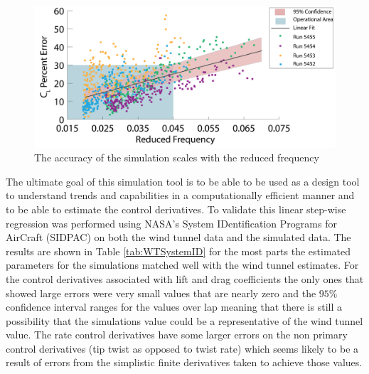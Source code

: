 \documentclass[11pt]{ucthesis}
\begin{document}
\begin{figure}[thpb]
\centering
\includegraphics[width=.75\linewidth]{Figures/ReducedFreqvCLPError-01.png}
\caption{The accuracy of the simulation scales with the reduced frequency}
\label{fig:RFreqvCLEr}
\end{figure}

The ultimate goal of this simulation tool is to be able to be used as a design tool to understand trends and capabilities in a computationally efficient manner and to be able to estimate the control derivatives. To validate this linear step-wise regression was performed using NASA's System IDentification Programs for AirCraft (SIDPAC) \cite{klein2006aircraft} on both the wind tunnel data and the simulated data. The results are shown in Table \ref{tab:WTSystemID} for the most parts the estimated parameters for the simulations matched well with the wind tunnel estimates. For the control derivatives associated with lift and drag coefficients the only ones that showed large errors were very small values that are nearly zero and the $95\%$ confidence interval ranges for the values over lap meaning that there is still a possibility that the simulations value could be a representative of the wind tunnel value. The rate control derivatives have some larger errors on the non primary control derivatives (tip twist as opposed to twist rate) which seems likely to be a result of errors from the simplistic finite derivatives  taken to achieve those values.%
\end{document}
